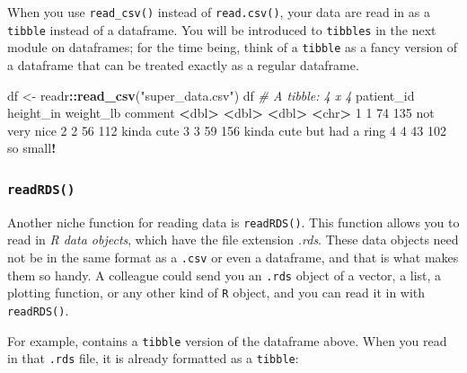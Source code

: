 \documentclass[
]{book}
\newenvironment{Shaded}{\begin{snugshade}}{\end{snugshade}}
\newcommand{\CommentTok}[1]{\textcolor[rgb]{0.56,0.35,0.01}{\textit{#1}}}
\newcommand{\DecValTok}[1]{\textcolor[rgb]{0.00,0.00,0.81}{#1}}
\newcommand{\ErrorTok}[1]{\textcolor[rgb]{0.64,0.00,0.00}{\textbf{#1}}}
\newcommand{\KeywordTok}[1]{\textcolor[rgb]{0.13,0.29,0.53}{\textbf{#1}}}
\newcommand{\NormalTok}[1]{#1}
\newcommand{\OperatorTok}[1]{\textcolor[rgb]{0.81,0.36,0.00}{\textbf{#1}}}
\newcommand{\StringTok}[1]{\textcolor[rgb]{0.31,0.60,0.02}{#1}}
\begin{document}
When you use \texttt{read\_csv()} instead of \texttt{read.csv()}, your data are read in as a \texttt{tibble} instead of a dataframe. You will be introduced to \texttt{tibbles} in the next module on dataframes; for the time being, think of a \texttt{tibble} as a fancy version of a dataframe that can be treated exactly as a regular dataframe.

\begin{Shaded}
\begin{Highlighting}[]
\NormalTok{df <-}\StringTok{ }\NormalTok{readr}\OperatorTok{::}\KeywordTok{read_csv}\NormalTok{(}\StringTok{"super_data.csv"}\NormalTok{)}
\NormalTok{df}
\CommentTok{# A tibble: 4 x 4}
\NormalTok{  patient_id height_in weight_lb comment                  }
       \OperatorTok{<}\NormalTok{dbl}\OperatorTok{>}\StringTok{     }\ErrorTok{<}\NormalTok{dbl}\OperatorTok{>}\StringTok{     }\ErrorTok{<}\NormalTok{dbl}\OperatorTok{>}\StringTok{ }\ErrorTok{<}\NormalTok{chr}\OperatorTok{>}\StringTok{                    }
\DecValTok{1}          \DecValTok{1}        \DecValTok{74}       \DecValTok{135}\NormalTok{ not very nice            }
\DecValTok{2}          \DecValTok{2}        \DecValTok{56}       \DecValTok{112}\NormalTok{ kinda cute               }
\DecValTok{3}          \DecValTok{3}        \DecValTok{59}       \DecValTok{156}\NormalTok{ kinda cute but had a ring}
\DecValTok{4}          \DecValTok{4}        \DecValTok{43}       \DecValTok{102}\NormalTok{ so small}\OperatorTok{!}\StringTok{                }
\end{Highlighting}
\end{Shaded}

\hypertarget{readrds}{%
\subsubsection*{\texorpdfstring{\texttt{readRDS()}}{readRDS()}}\label{readrds}}

Another niche function for reading data is \texttt{readRDS()}. This function allows you to read in \emph{R data objects}, which have the file extension \emph{.rds}. These data objects need not be in the same format as a \texttt{.csv} or even a dataframe, and that is what makes them so handy. A colleague could send you an \texttt{.rds} object of a vector, a list, a plotting function, or any other kind of \texttt{R} object, and you can read it in with \texttt{readRDS()}.

For example, contains a \texttt{tibble} version of the dataframe above. When you read in that \texttt{.rds} file, it is already formatted as a \texttt{tibble}:
\end{document}
